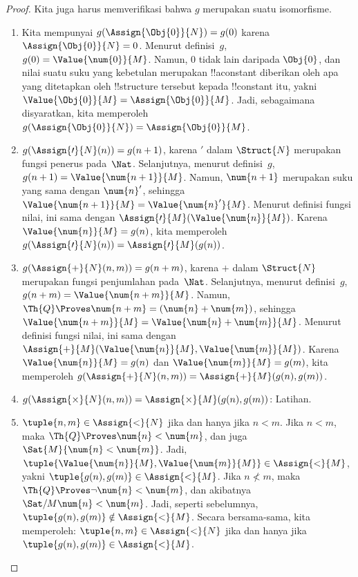 \documentclass[../../../include/open-logic-section]{subfiles}
\begin{document}
\begin{proof}
Kita juga harus memverifikasi bahwa $g$ merupakan suatu isomorfisme.
\begin{enumerate}
\item Kita mempunyai $g(\Assign{\Obj{0}}{N}) = g(0)$ karena
  $\Assign{\Obj{0}}{N} = 0$. Menurut definisi~$g$, $g(0) =
  \Value{\num{0}}{M}$. Namun, $\num{0}$ tidak lain daripada $\Obj{0}$, dan
  nilai suatu suku yang kebetulan merupakan !!a{constant} diberikan oleh apa
  yang ditetapkan oleh !!{structure} tersebut kepada !!{constant} itu, yakni
  $\Value{\Obj{0}}{M} = \Assign{\Obj{0}}{M}$. Jadi, sebagaimana disyaratkan,
  kita memperoleh $g(\Assign{\Obj{0}}{N}) = \Assign{\Obj{0}}{M}$.
\item $g(\Assign{\prime}{N}(n)) = g(n+1)$, karena $\prime$ dalam
  $\Struct{N}$ merupakan fungsi penerus pada~$\Nat$. Selanjutnya, menurut
  definisi~$g$, $g(n+1) = \Value{\num{n+1}}{M}$. Namun, $\num{n+1}$ merupakan
  suku yang sama dengan $\num{n}'$, sehingga $\Value{\num{n+1}}{M} =
  \Value{\num{n}'}{M}$. Menurut definisi fungsi nilai, ini sama dengan
  $\Assign{\prime}{M}(\Value{\num{n}}{M})$. Karena
  $\Value{\num{n}}{M} = g(n)$, kita memperoleh
  $g(\Assign{\prime}{N}(n)) = \Assign{\prime}{M}(g(n))$.
\item $g(\Assign{+}{N}(n,m)) = g(n+m)$, karena $+$ dalam $\Struct{N}$
  merupakan fungsi penjumlahan pada~$\Nat$. Selanjutnya, menurut definisi~$g$,
  $g(n+m) = \Value{\num{n+m}}{M}$. Namun, $\Th{Q} \Proves
  \num{n+m} = (\num{n} + \num{m})$, sehingga
  $\Value{\num{n+m}}{M} = \Value{\num{n}+\num{m}}{M}$. Menurut definisi
  fungsi nilai, ini sama dengan
  $\Assign{+}{M}(\Value{\num{n}}{M},\Value{\num{m}}{M})$. Karena
  $\Value{\num{n}}{M} = g(n)$ dan $\Value{\num{m}}{M} = g(m)$, kita
  memperoleh $g(\Assign{+}{N}(n, m)) = \Assign{+}{M}(g(n), g(m))$.
\item $g(\Assign{\times}{N}(n, m)) =
  \Assign{\times}{M}(g(n), g(m))$: Latihan.
\item $\tuple{n,m} \in \Assign{<}{N}$ jika dan hanya jika $n < m$. Jika
  $n < m$, maka $\Th{Q} \Proves \num{n} < \num{m}$, dan juga
  $\Sat{M}{\num{n} < \num{m}}$. Jadi,
  $\tuple{\Value{\num{n}}{M}, \Value{\num{m}}{M}} \in \Assign{<}{M}$,
  yakni $\tuple{g(n), g(m)} \in \Assign{<}{M}$. Jika $n \not< m$, maka
  $\Th{Q} \Proves \lnot \num{n} < \num{m}$, dan akibatnya
  $\Sat/{M}{\num{n} < \num{m}}$. Jadi, seperti sebelumnya,
  $\tuple{g(n), g(m)} \notin \Assign{<}{M}$. Secara bersama-sama, kita
  memperoleh: $\tuple{n,m} \in \Assign{<}{N}$ jika dan hanya jika
  $\tuple{g(n), g(m)} \in \Assign{<}{M}$.
\end{enumerate}
\end{proof}
\end{document}
